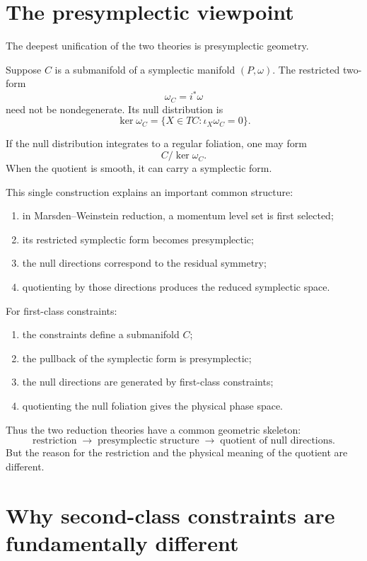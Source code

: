 \documentclass[11pt,a4paper]{article}
\theoremstyle{definition}
\begin{document}
\section{The presymplectic viewpoint}

The deepest unification of the two theories is presymplectic geometry.

Suppose $C$ is a submanifold of a symplectic manifold $(P,\omega)$.  The
restricted two-form
\[
        \omega_C=i^*\omega
\]
need not be nondegenerate.  Its null distribution is
\[
        \ker\omega_C
        =
        \{X\in TC:\iota_X\omega_C=0\}.
\]

If the null distribution integrates to a regular foliation, one may form
\[
        C/\ker\omega_C.
\]
When the quotient is smooth, it can carry a symplectic form.

This single construction explains an important common structure:

\begin{enumerate}
\item in Marsden--Weinstein reduction, a momentum level set is first selected;
\item its restricted symplectic form becomes presymplectic;
\item the null directions correspond to the residual symmetry;
\item quotienting by those directions produces the reduced symplectic space.
\end{enumerate}

For first-class constraints:

\begin{enumerate}
\item the constraints define a submanifold $C$;
\item the pullback of the symplectic form is presymplectic;
\item the null directions are generated by first-class constraints;
\item quotienting the null foliation gives the physical phase space.
\end{enumerate}

Thus the two reduction theories have a common geometric skeleton:
\[
        \boxed{
        \text{restriction}
        \;\longrightarrow\;
        \text{presymplectic structure}
        \;\longrightarrow\;
        \text{quotient of null directions}.
        }
\]
But the reason for the restriction and the physical meaning of the quotient
are different.

\section{Why second-class constraints are fundamentally different}
\end{document}
